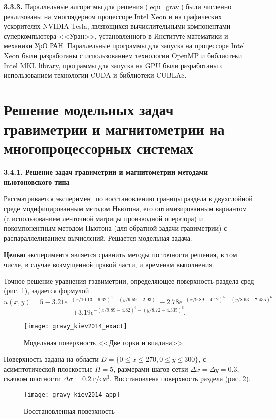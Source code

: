 {\bfseries 3.3.3.} Параллельные алгоритмы для решения (\ref{equ_grav}) были численно реализованы на многоядерном процессоре Intel Xeon и на графических ускорителях NVIDIA Tesla, являющихся вычислительными компонентами суперкомпьютера <<Уран>>, установленного в Институте математики и механики УрО РАН. Параллельные программы для запуска на процессоре Intel Xeon были разработаны с использованием технологии OpenMP и библиотеки Intel MKL library, программы для запуска на GPU были разработаны с использованием технологии CUDA и библиотеки CUBLAS. 

\newpage
\section{Решение модельных задач гравиметрии и магнитометрии на многопроцессорных системах}

{\bfseries 3.4.1. Решение задач гравиметрии и магнитометрии методами ньютоновского типа} 

Рассматривается эксперимент по восстановлению границы раздела в двухслойной среде модифицированным методом Ньютона, его оптимизированным вариантом (c использованием ленточной матрицы производной оператора) и покомпонентным методом Ньютона (для обратной задачи гравиметрии) с распараллеливанием вычислений. Решается модельная задача. 

{\bfseries Целью} эксперимента является сравнить методы по точности решения, в том числе, в случае возмущенной правой части, и временам выполнения. 

Точное решение уравнения гравиметрии, определяющее поверхность раздела сред (рис. \ref{fig:gravy_kiev2014_exact}), задается формулой
$$\hat{u}(x,y)=5-3.21e^{-(x/10.13-6.62)^6-(y/9.59-2.93)^6}-2.78e^{-(x/9.89-4.12)^6-(y/8.63-7.435)^6}$$ 
\begin{equation}\label{exact_exp3.4.1}
+3.19e^{-(x/9.89-4.82)^6-(y/8.72-4.335)^6}.
\end{equation}
\begin{figure}[h]
	\centering
	\texttt{[image: gravy\_kiev2014\_exact]}
	\caption{Модельная поверхность <<Две горки и впадина>>}
	\label{fig:gravy_kiev2014_exact}
\end{figure}
Поверхность задана на области $D=\{0\le x\le 270, 0\le y\le 300\}$, с асимптотической плоскостью $H=5$, размерами шагов сетки $\Delta x=\Delta y=0.3$, скачком плотности $\Delta\sigma=0.2$ г/см$^3$. Восстановлена поверхность раздела (рис. \ref{fig:gravy_kiev2014_app}).
\begin{figure}[h]
	\centering
	\texttt{[image: gravy\_kiev2014\_app]}
	\caption{Восстановленная поверхность}
	\label{fig:gravy_kiev2014_app}
\end{figure}

